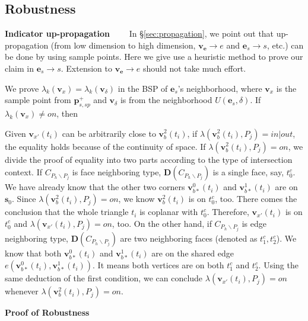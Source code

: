 \documentclass[10pt,journal,compsoc]{IEEEtran}
\begin{document}
\iffalse

\subsection{Robustness}

\vspace{0.5em}
\noindent\textbf{Indicator up-propagation}~~~~
In \S\ref{sec:propagation}, we point out that up-propagation (from low dimension to high dimension, $\bm{v}_{\bm{e}}\to e$ and $\bm{e}_s\to s$, etc.) can be done by using sample points. Here we give use a heuristic method to prove our claim in $\bm{e}_s\to s$. Extension to $\bm{v}_{\bm{e}}\to e$ should not take much effort.

\vspace{0.5em}\noindent We prove $\lambda_k(\bm{v}_x)=\lambda_k(\bm{v}_{\delta})$ in the BSP of $\bm{e}_s$'s neighborhood, where $ \bm{v}_x$ is the sample point from $\bm{p}_{s, sp}^+$ and $\bm{v}_{\delta}$ is from the neighborhood $U(\bm{e}_s, \delta)$. If $\lambda_k(\bm{v}_x) \neq on$, then

Given $\bm{v}_{x'}(t_i)$ can be arbitrarily close to $\bm{v}_b^2(t_i)$, if $\lambda(\bm{v}_b^2(t_i), P_j) = in | out$, the equality holds because of the continuity of space. If $\lambda(\bm{v}_b^2(t_i), P_j) = on$, we divide the proof of equality into two parts according to the type of intersection context. If $C_{P_h \backslash P_j}$ is face neighboring type, $\boldsymbol{D}(C_{P_h \backslash P_j})$ is a single face, say, $t_0^c$. We have already know that the other two corners $\bm{v}_{b*}^{0}(t_i)$ and $\bm{v}_{b*}^{1}(t_i)$ are on $\bm{s}_0$. Since $\lambda(\bm{v}_b^2(t_i), P_j) = on$, we know $\bm{v}_b^2(t_i)$ is on $t_0^c$, too. There comes the conclusion that the whole triangle $t_i$ is coplanar with $t_0^c$. Therefore, $\bm{v}_{x'}(t_i)$ is on $t_0^c$ and $\lambda(\bm{v}_{x'}(t_i), P_j) = on$, too. On the other hand, if $C_{P_h \backslash P_j}$ is edge neighboring type, $\boldsymbol{D}(C_{P_h \backslash P_j})$ are two neighboring faces (denoted as $t_1^c, t_2^c$). We know that both $\bm{v}_{b*}^{0}(t_i)$ and $\bm{v}_{b*}^{1}(t_i)$ are on the shared edge $e(\bm{v}_{b*}^{0}(t_i), \bm{v}_{b*}^{1}(t_i))$. It means both vertices are on both $t_1^c$ and $t_2^c$. Using the same deduction of the first condition, we can conclude $\lambda(\bm{v}_{x'}(t_i), P_j) = on$ whenever $\lambda(\bm{v}_b^2(t_i), P_j) = on$.

\vspace{0.5em}
\noindent\textbf{Proof of Robustness}
\end{document}
